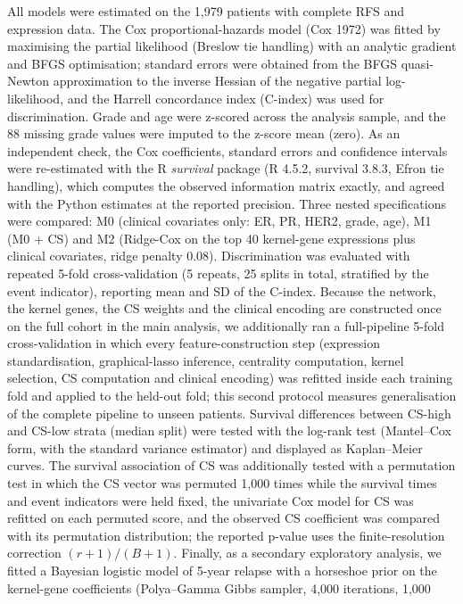 \documentclass[12pt]{article}
\begin{document}
All models were estimated on the 1,979 patients with complete RFS and
expression data. The Cox proportional-hazards model (Cox 1972) was fitted
by maximising the partial likelihood (Breslow tie handling) with an analytic
gradient and BFGS optimisation; standard errors were obtained from the
BFGS quasi-Newton approximation to the inverse Hessian of the negative
partial log-likelihood, and the Harrell concordance index (C-index) was used
for discrimination. Grade and age were z-scored across the analysis sample,
and the 88 missing grade values were imputed to the z-score mean (zero). As
an independent check, the Cox coefficients, standard errors and confidence
intervals were re-estimated with the R \emph{survival} package (R 4.5.2,
survival 3.8.3, Efron tie handling), which computes the observed
information matrix exactly, and agreed with the Python estimates at the
reported precision. Three nested specifications were compared: M0 (clinical
covariates only: ER, PR, HER2, grade, age), M1 (M0 + CS) and M2 (Ridge-Cox
on the top 40 kernel-gene expressions plus clinical covariates, ridge
penalty 0.08). Discrimination was evaluated with repeated 5-fold
cross-validation (5 repeats, 25 splits in total, stratified by the event
indicator), reporting mean and SD of the C-index. Because the network, the
kernel genes, the CS weights and the clinical encoding are constructed once
on the full cohort in the main analysis, we additionally ran a full-pipeline
5-fold cross-validation in which every feature-construction step (expression
standardisation, graphical-lasso inference, centrality computation, kernel
selection, CS computation and clinical encoding) was refitted inside each
training fold and applied to the held-out fold; this second protocol
measures generalisation of the complete pipeline to unseen patients.
Survival differences between CS-high and CS-low strata (median split) were
tested with the log-rank test (Mantel--Cox form, with the standard variance
estimator) and displayed as Kaplan--Meier curves. The survival association
of CS was additionally tested with a permutation test in which the CS vector
was permuted 1,000 times while the survival times and event indicators were
held fixed, the univariate Cox model for CS was refitted on each permuted
score, and the observed CS coefficient was compared with its permutation
distribution; the reported p-value uses the finite-resolution correction
$(r+1)/(B+1)$. Finally, as a secondary exploratory analysis, we fitted a
Bayesian logistic model of 5-year relapse with a horseshoe prior on the
kernel-gene coefficients (Polya--Gamma Gibbs sampler, 4,000 iterations, 1,000
\end{document}
